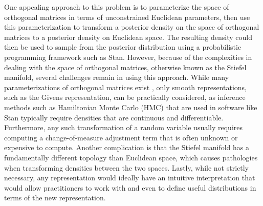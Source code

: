 \documentclass[ba]{imsart}
\numberwithin{equation}{section}
\theoremstyle{plain}
\begin{document}
\noindent One appealing approach to this problem is to parameterize the space of orthogonal matrices in terms of unconstrained Euclidean parameters, then use this parameterization to transform a posterior density on the space of orthogonal matrices to a posterior density on Euclidean space. The resulting density could then be used to sample from the posterior distribution using a probabilistic programming framework such as Stan. However, because of the complexities in dealing with the space of orthogonal matrices, otherwise known as the Stiefel manifold, several challenges remain in using this approach. While many parameterizations of orthogonal matrices exist \citep{anderson1987generation, shepard2015representation}, only smooth representations, such as the Givens representation, can be practically considered, as inference methods such as Hamiltonian Monte Carlo (HMC) that are used in software like Stan typically require densities that are continuous and differentiable. Furthermore, any such transformation of a random variable usually requires computing a change-of-measure adjustment term that is often unknown or expensive to compute. Another complication is that the Stiefel manifold has a fundamentally different topology than Euclidean space, which causes pathologies when transforming densities between the two spaces.  Lastly, while not strictly necessary, any representation would ideally have an intuitive interpretation that would allow practitioners to work with and even to define useful distributions in terms of the new representation.
\end{document}
